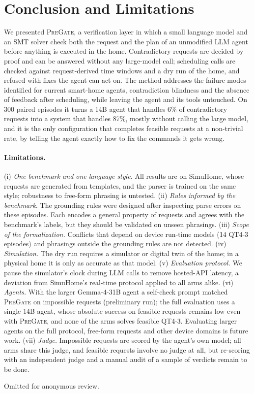 \documentclass[sigconf]{aamas}
\newcommand{\sys}{\textsc{PreGate}}
\begin{document}
\section{Conclusion and Limitations}

We presented \sys{}, a verification layer in which a small language model and an SMT solver check both the
request and the plan of an unmodified LLM agent before anything is executed in the home. Contradictory requests
are decided by proof and can be answered without any large-model call; scheduling calls are checked against
request-derived time windows and a dry run of the home, and refused with fixes the agent can act on. The method
addresses the failure modes identified for current smart-home agents, contradiction blindness and the absence
of feedback after scheduling, while leaving the agent and its tools untouched. On 300 paired episodes it
turns a 14B agent that handles 6\% of contradictory requests into a system that handles 87\%, mostly without
calling the large model, and it is the only configuration that completes feasible requests at a non-trivial
rate, by telling the agent exactly how to fix the commands it gets wrong.

\paragraph{Limitations.} (i) \emph{One benchmark and one language style.} All results are on SimuHome, whose
requests are generated from templates, and the parser is trained on the same style; robustness to free-form
phrasing is untested. (ii) \emph{Rules informed by the benchmark.} The grounding rules were designed after
inspecting parse errors on these episodes. Each encodes a general property of requests and agrees with the
benchmark's labels, but they should be validated on unseen phrasings. (iii) \emph{Scope of the formalization.}
Conflicts that depend on device run-time models (14 QT4-3 episodes) and phrasings outside the grounding rules
are not detected. (iv) \emph{Simulation.} The dry run requires a simulator or digital twin of the home; in a
physical home it is only as accurate as that model. (v) \emph{Evaluation protocol.} We pause the simulator's
clock during LLM calls to remove hosted-API latency, a deviation from SimuHome's real-time protocol applied to
all arms alike. (vi) \emph{Agents.} With the larger Gemma-4-31B agent a self-check prompt matched \sys{} on
impossible requests (preliminary run); the full evaluation uses a single 14B agent, whose absolute success on
feasible requests remains low even with \sys{}, and none of the arms solves feasible QT4-3. Evaluating larger
agents on the full protocol, free-form requests and other device domains is future work. (vii) \emph{Judge.}
Impossible requests are scored by the agent's own model; all arms share this judge, and feasible requests involve
no judge at all, but re-scoring with an independent judge and a manual audit of a sample of verdicts remain to be
done.

\begin{acks}
Omitted for anonymous review.
\end{acks}

\balance


\end{document}
